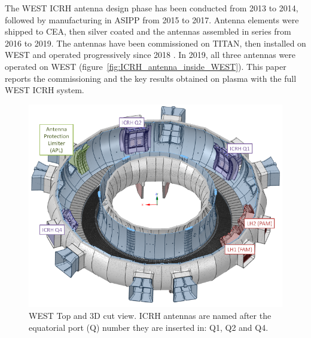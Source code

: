 \documentclass[12p]{iopart}
\begin{document}
The WEST ICRH antenna design phase has been conducted from 2013 to 2014, followed by manufacturing in ASIPP from 2015 to 2017. Antenna elements were shipped to CEA, then silver coated and the antennas assembled in series from 2016 to 2019. The antennas have been commissioned on TITAN, then installed on WEST and operated progressively since 2018 \cite{bernard2017, bernard2019, helou2020}. In 2019, all three antennas were operated on WEST (figure~\ref{fig:ICRH_antenna_inside_WEST}). This paper reports the commissioning and the key results obtained on plasma with the full WEST ICRH system.

\begin{figure}
	\centering
	\includegraphics[width=0.95\linewidth]{figures/WEST_overview}
	\caption{WEST Top and 3D cut view. ICRH antennas are named after the equatorial port (Q) number they are inserted in: Q1, Q2 and Q4.}
	\label{fig:westoverview}
\end{figure}
\end{document}
